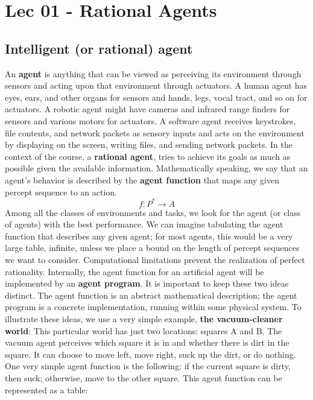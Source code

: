 \chapter{Lec 01 - Rational Agents}
\section{Intelligent (or rational) agent}
An \textbf{agent} is anything that can be viewed as perceiving its environment through sensors and acting upon that environment through actuators. A human agent has eyes, ears, and other organs for sensors and hands, legs, vocal tract, and so on for actuators. A robotic agent might have cameras and infrared range finders for sensors and various motors for actuators. A software agent receives keystrokes, file contents, and network packets as sensory inputs and acts on the environment by displaying on the screen, writing files, and sending network packets.\newline\newline
In the context of the course, a \textbf{rational agent}, tries to achieve its goals as much as possible given the available information.\newline\newline
Mathematically speaking, we say that an agent’s behavior is described by the \textbf{agent function} that maps any given percept sequence to an action.
\[f : P^* \rightarrow A\]
Among all the classes of environments and tasks, we look for the agent (or class of agents) with the best performance. We can imagine tabulating the agent function that describes any given agent; for most agents, this would be a very large table, infinite, unless we place a bound on the length of percept sequences we want to consider. Computational limitations prevent the realization of perfect rationality.\newline\newline
Internally, the agent function for an artificial agent will be implemented by an \textbf{agent program}. It is important to keep these two ideas distinct. The agent function is an abstract mathematical description; the agent program is a concrete implementation, running within some physical system.\newline\newline
To illustrate these ideas, we use a very simple example, \textbf{the vacuum-cleaner world}: This particular world has just two locations: squares A and B. The vacuum agent perceives which square it is in and whether there is dirt in the square. It can choose to move left, move right, suck up the dirt, or do nothing. One very simple agent function is the following: if the current square is dirty, then suck; otherwise, move to the other square. This agent function can be represented as a table:
